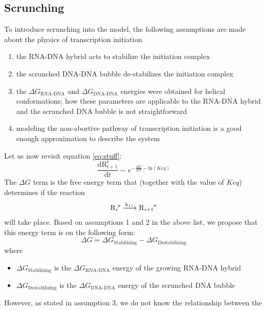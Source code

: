 \documentclass[a4paper]{article}
\newcommand{\te}[1]{\text{#1}}
\newcommand{\diff}[2]{\frac{\mathrm{d} #1}{\mathrm{d} #2}}
\begin{document}
\subsection{Scrunching}
To introduce scrunching into the model, the following assumptions are made
about the physics of transcription initiation
\begin{enumerate}
	\item the RNA-DNA hybrid acts to stabilize the initiation complex
	\item the scrunched DNA-DNA bubble de-stabilizes the initiation complex
	\item the $\Delta G_{\text{RNA-DNA}}$ and $\Delta G_{\text{DNA-DNA}}$
		energies were obtained for helical conformations; how these parameters
		are applicable to the RNA-DNA hybrid and the scrunched DNA bubble is not straightforward
	\item modeling the non-abortive pathway of transcription initiation is a
		good enough approximation to describe the system
\end{enumerate}
Let us now revisit equation \eqref{eq:stuff}:
\begin{equation*}
	\diff{\te{R}_{i+1}^{\te{e}}}{t} \sim e^{-\frac{\Delta G}{RT} - \te{ln}(Keq)}
\end{equation*}
The $\Delta G$ term is the free energy term that (together with the value of
$Keq$) determines if the reaction
\begin{align*}
\ce{R_i^{\text{s}}
->[\ce{k1_i}]
R_{i+1}^{\text{e}}
}
\end{align*}
will take place. Based on assumptions 1 and 2 in the above list, we propose
that this energy term is on the following form:
\begin{equation*}
	\Delta G = \Delta G_{\te{Stabilizing}} - \Delta G_{\te{Destabilizing}}
\end{equation*}
where
\begin{itemize}
	\item $\Delta G_{\te{Stabilizing}}$ is the $\Delta G_{\te{RNA-DNA}}$ energy
		of the growing RNA-DNA hybrid
	\item $\Delta G_{\te{Destabilizing}}$ is the $\Delta G_{\te{DNA-DNA}}$ energy
		of the scrunched DNA bubble
\end{itemize}
However, as stated in assumption 3, we do not know the relationship between the
\end{document}
